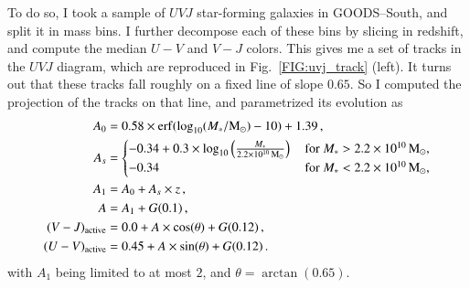 \documentclass[12pt,a4paper]{article}
\newcommand{\rfig}[1]{Fig.~\ref{#1}}
\newcommand{\msun}{{\rm M}_\odot}
\newcommand{\mstar}{M_\ast}
\newcommand{\uvj}{$UVJ$\xspace}
\begin{document}
To do so, I took a sample of \uvj star-forming galaxies in GOODS--South, and split it in mass bins. I further decompose each of these bins by slicing in redshift, and compute the median $U-V$ and $V-J$ colors. This gives me a set of tracks in the \uvj diagram, which are reproduced in \rfig{FIG:uvj_track} (left). It turns out that these tracks fall roughly on a fixed line of slope $0.65$. So I computed the projection of the tracks on that line, and parametrized its evolution as
\begin{align}
A_0 &= 0.58 \times {\rm erf}(\log_{10}(\mstar/\msun) - 10) + 1.39\,, \\
A_s &= \begin{cases}
-0.34 + 0.3 \times \log_{10}\left(\frac{\mstar}{2.2 \times 10^{10}\,\msun}\right)\,&\text{for $\mstar > 2.2 \times 10^{10}\,\msun$,} \\
-0.34\,&\text{for $\mstar < 2.2 \times 10^{10}\,\msun$,}
\end{cases} \\
A_1 &= A_0 + A_s \times z\,, \\
A &= A_1 + G(0.1)\,, \\
(V-J)_{\rm active} &= 0.0 + A \times \cos(\theta) + G(0.12)\,, \\
(U-V)_{\rm active} &= 0.45 + A \times \sin(\theta) + G(0.12)\,.
\end{align}
with $A_1$ being limited to at most $2$, and $\theta = \arctan(0.65)$.
\end{document}
